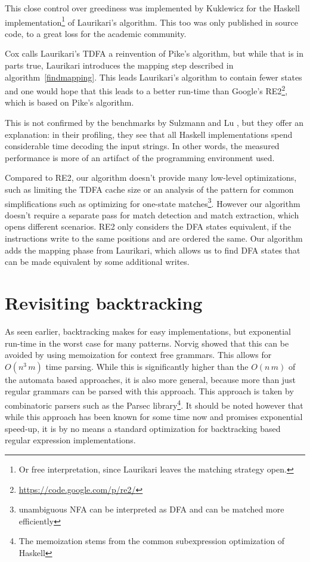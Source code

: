 \documentclass[11pt,a4paper,twoside,openright]{Thesis}
\theoremstyle{definition}
\newcommand{\seclabel}[1]{\label{sec:#1}}
\begin{document}
This close control over greediness was implemented by Kuklewicz\cite{Kukl07a}
for the Haskell implementation\footnote{Or free interpretation, since 
Laurikari leaves the matching strategy open.} of Laurikari's algorithm. This too was only
published in source code, to a great loss for the academic community.

Cox calls Laurikari's TDFA a reinvention of Pike's algorithm, but while that 
is in parts true, Laurikari introduces the mapping step described in 
algorithm~\ref{findmapping}. This leads Laurikari's algorithm to contain 
fewer states and one would hope that this leads to a better run-time than 
Google's \textsc{RE2}\footnote{\url{https://code.google.com/p/re2/}},
which is based on Pike's algorithm. 

This is not confirmed by the benchmarks by Sulzmann and Lu
\cite{Sulz12a}, but they offer an explanation: in their profiling, they see
that all Haskell implementations spend considerable time decoding the input
strings. In other words, the measured performance is more of an artifact of the
programming environment used.

Compared to \textsc{RE2}, our algorithm doesn't provide many low-level optimizations,
such as limiting the TDFA cache size or an analysis of the pattern for common
simplifications such as optimizing for one-state matches\footnote{unambiguous
NFA can be interpreted as DFA and can be matched more efficiently}. However
our algorithm doesn't require a separate pass for match detection and match
extraction, which opens different scenarios. \textsc{RE2} only considers the
DFA states equivalent, if the instructions write to the same positions and are
ordered the same. Our algorithm adds the mapping phase from Laurikari, which 
allows us to find DFA states that can be made equivalent by some additional writes.

\section{Revisiting backtracking}\seclabel{revise-backtrack}
As seen earlier, backtracking makes for easy implementations, but exponential
run-time in the worst case for many patterns. Norvig\cite{Norv91a} showed that
this can be avoided by using memoization for context free grammars.  This
allows for $O(n^3\, m)$ time parsing. While this is significantly higher than
the $O(n\, m)$ of the automata based approaches, it is also more general,
because more than just regular grammars can be parsed with this approach.  This
approach is taken by combinatoric parsers such as the Parsec
library\footnote{The memoization stems from the common subexpression
optimization of Haskell}.  It should be noted however that while this
approach has been known for some time now and promises exponential
speed-up, it is by no means a standard optimization for backtracking based
regular expression implementations.
\end{document}
